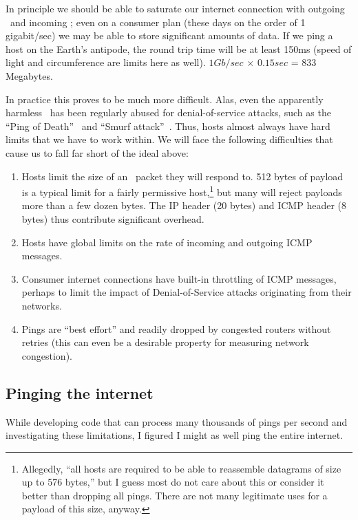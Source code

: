 \documentclass[twocolumn]{article}
\begin{document}
In principle we should be able to saturate our internet connection
with outgoing \icmpecho\ and incoming \icmpechoreply; even on a
consumer plan (these days on the order of 1 gigabit/sec) we may be
able to store significant amounts of data. If we ping a host on the
Earth's antipode, the round trip time will be at least 150ms (speed of
light and circumference are limits here as well). $1 Gb/sec$ $\times$
$0.15 sec$ = 833 Megabytes.

In practice this proves to be much more difficult. Alas, even the
apparently harmless \icmpecho\ has been regularly abused for
denial-of-service attacks, such as the ``Ping of
Death''~\cite{wikipediapingofdeath} and ``Smurf
attack''~\cite{wikipediasmurfattack}. Thus, hosts almost always have
hard limits that we have to work within. We will face the following
difficulties that cause us to fall far short of the ideal above:

\begin{enumerate}
\item Hosts limit the size of an \icmpecho\ packet they will respond to.
  512 bytes of payload is a typical limit for a fairly permissive
  host,\!\footnote{
    Allegedly, ``all hosts are required to be able to reassemble datagrams of
    size up to 576 bytes,''\cite{XXX} but I guess most do not care about this
    or consider it better than dropping all pings. There are not many
    legitimate uses for a payload of this size, anyway.
  }
  but many will reject payloads more than a few dozen bytes. The IP
  header (20 bytes) and ICMP header (8 bytes) thus contribute significant
  overhead.

\item Hosts have global limits on the rate of incoming and outgoing ICMP
  messages.
\item Consumer internet connections have built-in throttling of ICMP
  messages, perhaps to limit the impact of Denial-of-Service attacks
  originating from their networks.
\item Pings are ``best effort'' and readily dropped by congested
  routers without retries (this can even be a desirable property for
  measuring network congestion).
\end{enumerate}

\subsection{Pinging the internet} \label{sec:ping-internet}

While developing code that can process many thousands of pings per second
and investigating these limitations, I figured I might as well ping the
entire internet.
\end{document}
